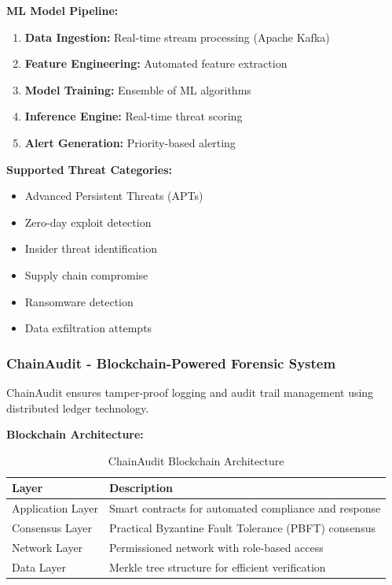 \documentclass[12pt,a4paper]{article}
\begin{document}
\textbf{ML Model Pipeline:}
\begin{enumerate}
    \item \textbf{Data Ingestion:} Real-time stream processing (Apache Kafka)
    \item \textbf{Feature Engineering:} Automated feature extraction
    \item \textbf{Model Training:} Ensemble of ML algorithms
    \item \textbf{Inference Engine:} Real-time threat scoring
    \item \textbf{Alert Generation:} Priority-based alerting
\end{enumerate}

\textbf{Supported Threat Categories:}
\begin{itemize}
    \item Advanced Persistent Threats (APTs)
    \item Zero-day exploit detection
    \item Insider threat identification
    \item Supply chain compromise
    \item Ransomware detection
    \item Data exfiltration attempts
\end{itemize}

\subsubsection{ChainAudit - Blockchain-Powered Forensic System}

ChainAudit ensures tamper-proof logging and audit trail management using distributed ledger technology.

\textbf{Blockchain Architecture:}
\begin{table}[H]
\centering
\begin{tabular}{|p{3cm}|p{12cm}|}
\hline
\rowcolor{lightblue}
\textbf{Layer} & \textbf{Description} \\
\hline
Application Layer & Smart contracts for automated compliance and response \\
\hline
Consensus Layer & Practical Byzantine Fault Tolerance (PBFT) consensus \\
\hline
Network Layer & Permissioned network with role-based access \\
\hline
Data Layer & Merkle tree structure for efficient verification \\
\hline
\end{tabular}
\caption{ChainAudit Blockchain Architecture}
\end{table}
\end{document}
